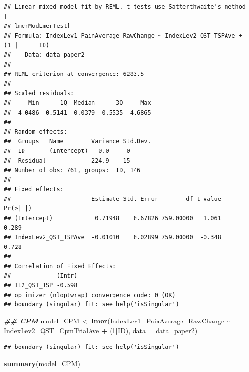 \documentclass[
  12pt,
]{article}
\newenvironment{Shaded}{\begin{snugshade}}{\end{snugshade}}
\newcommand{\AttributeTok}[1]{\textcolor[rgb]{0.13,0.29,0.53}{#1}}
\newcommand{\DecValTok}[1]{\textcolor[rgb]{0.00,0.00,0.81}{#1}}
\newcommand{\DocumentationTok}[1]{\textcolor[rgb]{0.56,0.35,0.01}{\textbf{\textit{#1}}}}
\newcommand{\FunctionTok}[1]{\textcolor[rgb]{0.13,0.29,0.53}{\textbf{#1}}}
\newcommand{\NormalTok}[1]{#1}
\newcommand{\OtherTok}[1]{\textcolor[rgb]{0.56,0.35,0.01}{#1}}
\newcommand{\SpecialCharTok}[1]{\textcolor[rgb]{0.81,0.36,0.00}{\textbf{#1}}}
\begin{document}
\begin{verbatim}
## Linear mixed model fit by REML. t-tests use Satterthwaite's method [
## lmerModLmerTest]
## Formula: IndexLev1_PainAverage_RawChange ~ IndexLev2_QST_TSPAve + (1 |      ID)
##    Data: data_paper2
## 
## REML criterion at convergence: 6283.5
## 
## Scaled residuals: 
##     Min      1Q  Median      3Q     Max 
## -4.0486 -0.5141 -0.0379  0.5535  4.6865 
## 
## Random effects:
##  Groups   Name        Variance Std.Dev.
##  ID       (Intercept)   0.0     0      
##  Residual             224.9    15      
## Number of obs: 761, groups:  ID, 146
## 
## Fixed effects:
##                       Estimate Std. Error        df t value Pr(>|t|)
## (Intercept)            0.71948    0.67826 759.00000   1.061    0.289
## IndexLev2_QST_TSPAve  -0.01010    0.02899 759.00000  -0.348    0.728
## 
## Correlation of Fixed Effects:
##             (Intr)
## IL2_QST_TSP -0.598
## optimizer (nloptwrap) convergence code: 0 (OK)
## boundary (singular) fit: see help('isSingular')
\end{verbatim}

\begin{Shaded}
\begin{Highlighting}[]
\DocumentationTok{\#\# CPM}
\NormalTok{model\_CPM }\OtherTok{\textless{}{-}} \FunctionTok{lmer}\NormalTok{(IndexLev1\_PainAverage\_RawChange }\SpecialCharTok{\textasciitilde{}}\NormalTok{ IndexLev2\_QST\_CpmTrialAve }\SpecialCharTok{+}\NormalTok{ (}\DecValTok{1}\SpecialCharTok{|}\NormalTok{ID), }\AttributeTok{data =}\NormalTok{ data\_paper2)}
\end{Highlighting}
\end{Shaded}

\begin{verbatim}
## boundary (singular) fit: see help('isSingular')
\end{verbatim}

\begin{Shaded}
\begin{Highlighting}[]
\FunctionTok{summary}\NormalTok{(model\_CPM)}
\end{Highlighting}
\end{Shaded}
\end{document}

